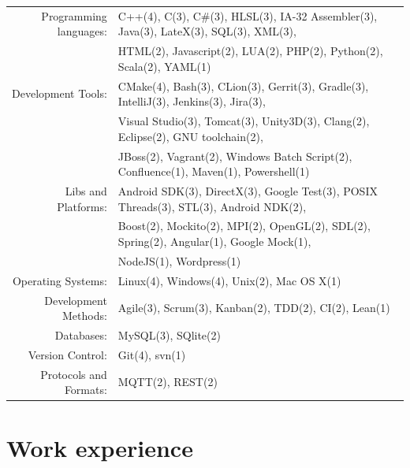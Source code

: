\documentclass[a4paper, 11pt]{article}
\begin{document}
\begin{tabular}{rl}
Programming languages:&
C++(4),
C(3),
C\#(3),
HLSL(3),
IA-32 Assembler(3),
Java(3),
LateX(3),
SQL(3),
XML(3),\\&
HTML(2),
Javascript(2),
LUA(2),
PHP(2),
Python(2),
Scala(2),
YAML(1)\\

Development Tools:&
CMake(4),
Bash(3),
CLion(3),
Gerrit(3),
Gradle(3),
IntelliJ(3),
Jenkins(3),
Jira(3),\\&
Visual Studio(3),
Tomcat(3),
Unity3D(3),
Clang(2),
Eclipse(2),
GNU toolchain(2),\\&
JBoss(2),
Vagrant(2),
Windows Batch Script(2),
Confluence(1),
Maven(1),
Powershell(1)\\

Libs and Platforms:&
Android SDK(3),
DirectX(3),
Google Test(3),
POSIX Threads(3),
STL(3),
Android NDK(2),\\&
Boost(2),
Mockito(2),
MPI(2),
OpenGL(2),
SDL(2),
Spring(2),
Angular(1),
Google Mock(1),\\&
NodeJS(1),
Wordpress(1)\\

Operating Systems:&
Linux(4),
Windows(4),
Unix(2),
Mac OS X(1)\\

Development Methods:&
Agile(3),
Scrum(3),
Kanban(2),
TDD(2),
CI(2),
Lean(1)\\

Databases:&
MySQL(3),
SQlite(2)\\

Version Control:&
Git(4),
svn(1)\\

Protocols and Formats:&
MQTT(2),
REST(2)\\

\end{tabular}

\section{Work experience}
\end{document}
